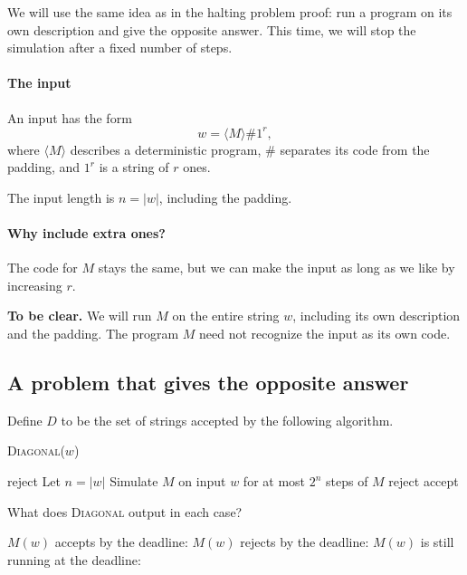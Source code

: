 \documentclass[11  pt]{article}
\begin{document}
We will use the same idea as in the halting problem proof: run a program on its own description and give the opposite answer. This time, we will stop the simulation after a fixed number of steps.

\paragraph{The input}
An input has the form
\begin{equation*}
    w=\langle M\rangle\#1^r,
\end{equation*}
where $\langle M\rangle$ describes a deterministic program, $\#$ separates its code from the padding, and $1^r$ is a string of $r$ ones.

The input length is $n=|w|$, including the padding.

\paragraph{Why include extra ones?}
The code for $M$ stays the same, but we can make the input as long as we like by increasing $r$.

\vs{1cm}
\textbf{To be clear.} We will run $M$ on the entire string $w$, including its own description and the padding. The program $M$ need not recognize the input as its own code.

\newpage
\subsection*{A problem that gives the opposite answer}
Define $D$ to be the set of strings accepted by the following algorithm.

\begin{algorithm}[h]
    \textsc{Diagonal}($w$)
    \begin{algorithmic}
            \State reject
        \EndIf
        \State Let $n=|w|$
        \State Simulate $M$ on input $w$ for at most $2^n$ steps of $M$
            \State reject
        \Else
            \State accept
        \EndIf
    \end{algorithmic}
\end{algorithm}

\begin{Qu}
    What does \textsc{Diagonal} output in each case?
    \begin{itemize}
        \aitem $M(w)$ accepts by the deadline: 
        \bitem $M(w)$ rejects by the deadline: 
        \citem $M(w)$ is still running at the deadline: 
    \end{itemize}
\end{Qu}
\end{document}
